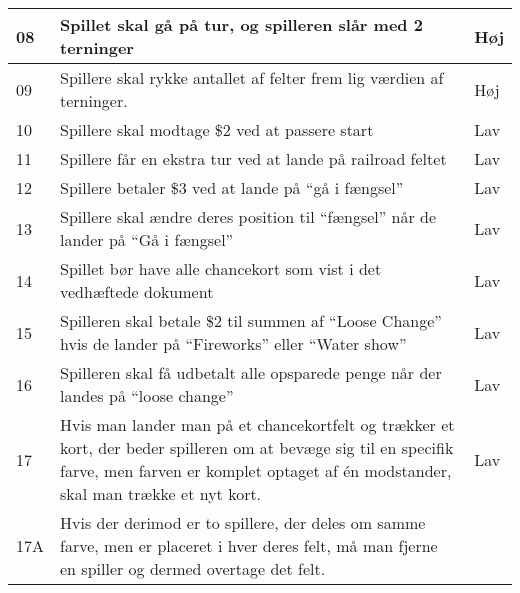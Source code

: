 \begin{table}[H]
\begin{tabular}{ |p{0.5cm}|p{10cm}|p{2cm}| }
       \hline
       08 & Spillet skal gå på tur, og spilleren slår med 2 terninger & Høj \\
       \hline
       09 & Spillere skal rykke antallet af felter frem lig værdien af terninger. & Høj \\
       \hline
       10 & Spillere skal modtage \$2 ved at passere start & Lav \\
       \hline
       11 & Spillere får en ekstra tur ved at lande på railroad feltet & Lav\\
       \hline
       12 & Spillere betaler \$3 ved at lande på “gå i fængsel” & Lav\\
       \hline
       13 & Spillere skal ændre deres position til “fængsel” når de lander på “Gå i fængsel” & Lav\\
       \hline
       14 & Spillet bør have alle chancekort som vist i det vedhæftede dokument & Lav \\
       \hline
       15 & Spilleren skal betale \$2 til summen af “Loose Change” hvis de lander på “Fireworks” eller “Water show” & Lav \\
       \hline
       16 & Spilleren skal få udbetalt alle opsparede penge når der landes på “loose change” & Lav\\
       \hline
       17 & Hvis man lander man på et chancekortfelt og trækker et kort, der beder spilleren om at bevæge sig til en specifik farve, men farven er komplet optaget af én modstander, skal man trække et nyt kort. & Lav \\
       17A & Hvis der derimod er to spillere, der deles om samme farve, men er placeret i hver deres felt, må man fjerne en spiller og dermed overtage det felt. & \\
       \hline
   \end{tabular}
 \end{table}